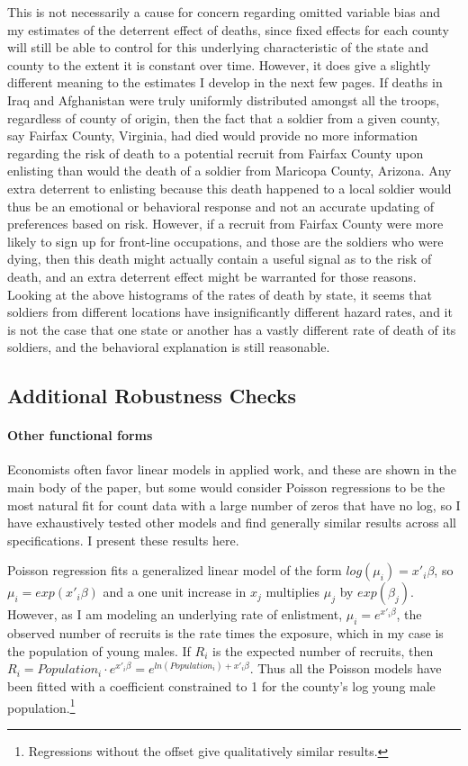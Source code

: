 \documentclass[12pt] {article}
\begin{document}
This is not necessarily a cause for concern regarding omitted variable bias and my estimates of the deterrent effect of deaths,
since fixed effects for each county will still be able to control for this underlying characteristic of the state and county to the extent it is constant over time. However, it does give a slightly different meaning to the estimates I develop in the next few pages. If deaths in Iraq and Afghanistan were truly uniformly
distributed amongst all the troops, regardless of county of origin, then the fact that a soldier from a given county, say Fairfax
County, Virginia, had died would provide no more information regarding
the risk of death to a potential recruit from Fairfax County upon
enlisting than would the death of a soldier from Maricopa County,
Arizona. Any extra deterrent to enlisting because this death happened to a local soldier would thus be an emotional or behavioral response and not
an accurate updating of preferences based on risk. However, if a recruit
from Fairfax County were more likely to sign up for front-line occupations,
and those are the soldiers who were dying, then this death might actually
contain a useful signal as to the risk of death, and an extra deterrent
effect might be warranted for those reasons. Looking at the above
histograms of the rates of death by state, it seems that soldiers
from different locations have insignificantly different hazard rates, and
it is not the case that one state or another has a vastly different
rate of death of its soldiers, and the behavioral explanation is still reasonable.

\subsection {Additional Robustness Checks}
\paragraph{Other functional forms}
Economists often favor linear models in applied work, and these are shown in the main body of the paper, but some would consider Poisson regressions to be the most natural fit for count data with a large number of zeros that have no log, so I have exhaustively tested other models and find generally similar results across all specifications. I present these results here. 

Poisson regression fits a generalized linear model of the form $log(\mu_{i})=x'_{i}\beta$, so $\mu_{i}=exp(x'_{i}\beta)$ and a one unit increase in $x_{j}$ multiplies $\mu_{j}$ by $exp(\beta_{j})$. However, as I am modeling an underlying rate of enlistment, $\mu_{i}=e^{x'_{i}\beta}$, the observed number of recruits is the rate times the exposure, which in my case is the population of young males. If $R_{i}$ is the expected number of recruits, then $R_{i}=Population_{i}\cdot e^{x'_{i}\beta}=e^{ln(Population_{i})+x'_{i}\beta}$.
Thus all the Poisson models have been fitted with a coefficient constrained
to 1 for the county's log young male population.\footnote{Regressions without the offset give qualitatively similar results.} 
\end{document}
